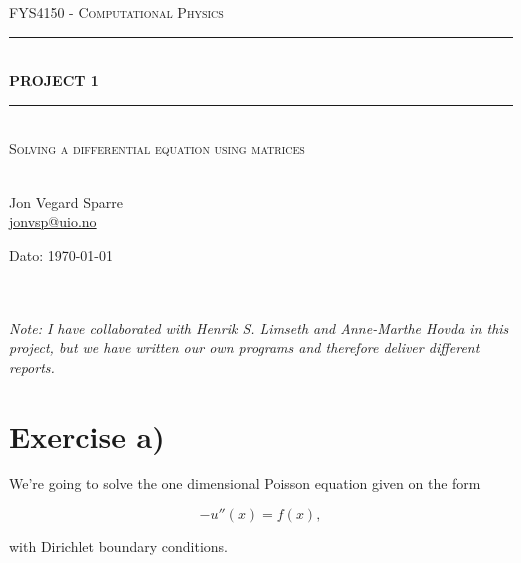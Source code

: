 \documentclass[english, 11pt]{article}
\begin{document}
\begin{titlepage}
\begin{center}

\textsc{\Large FYS4150 - Computational Physics}\\[0.5cm]
\rule{\linewidth}{0.5mm} \\[0.4cm]
{ \huge \bfseries  PROJECT 1}\\[0.10cm]
\rule{\linewidth}{0.5mm} \\[1.5cm]
\textsc{\Large Solving a differential equation using matrices}\\[1.5cm]
\textsc{}\\[1.5cm]


\begin{minipage}{0.49\textwidth}
    \begin{center} \large
        Jon Vegard Sparre\\ \url{jonvsp@uio.no} \\[0.8cm]
    \end{center}
\end{minipage}


\vfill

\large{Dato: \today}

\end{center}
\end{titlepage}

\\ \\
\emph{Note: I have collaborated with Henrik S. Limseth and Anne-Marthe Hovda in this project, but we have written our own programs and therefore deliver different reports.}

\section*{Exercise a)}

We're going to solve the one dimensional Poisson equation given on the form

\begin{equation}
    -u''(x) = f(x), \label{eq:diff}
\end{equation}

with Dirichlet boundary conditions. 
\end{document}
